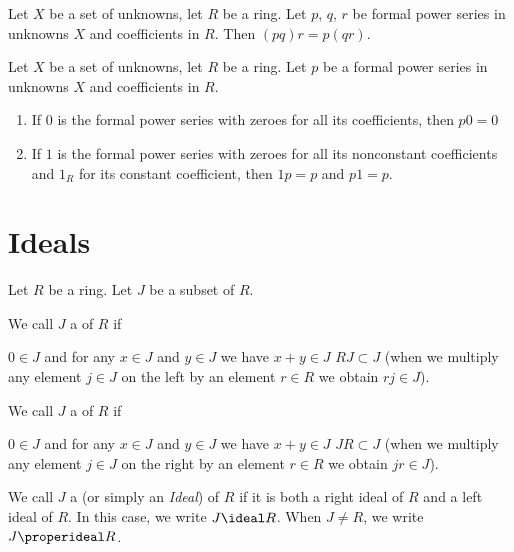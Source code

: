 \begin{theorem}
Let $X$ be a set of unknowns, let $R$ be a ring. Let $p$, $q$, $r$ be
formal power series in unknowns $X$ and coefficients in $R$. Then
$(pq)r=p(qr)$.
\end{theorem}

\begin{theorem}
Let $X$ be a set of unknowns, let $R$ be a ring. Let $p$ be a
formal power series in unknowns $X$ and coefficients in $R$. 
\begin{enumerate}
\item If $0$ is the formal power series with zeroes for all its
  coefficients, then $p0=0$
\item If $1$ is the formal power series with zeroes for all its
  nonconstant coefficients and $1_{R}$ for its constant coefficient,
  then $1p=p$ and $p1=p$.
\end{enumerate}
\end{theorem}

\section{Ideals}

\begin{definition}
Let $R$ be a ring. Let $J$ be a subset of $R$.

We call $J$ a  of $R$ if
\begin{itemize}
 $0\in J$ and
 for any $x\in J$ and $y\in J$ we have
  $x+y\in J$
 $RJ\subset J$ (when we multiply any
element $j\in J$ on the left by an element $r\in R$ we obtain $rj\in J$).
\end{itemize}

\noindent%
We call $J$ a  of $R$ if
\begin{itemize}
 $0\in J$ and
 for any $x\in J$ and $y\in J$ we have
  $x+y\in J$
 $JR\subset J$ (when we
  multiply any element $j\in J$ on the right by an element $r\in R$ we obtain $jr\in J$).
\end{itemize}

\noindent%
We call $J$ a  (or simply an \emph{Ideal}) of
$R$ if it is both a right ideal of $R$ and a left ideal of $R$.
In this case, we write $J\ideal R$. When $J\neq R$, we write
$J\properideal R$.
\end{definition}

